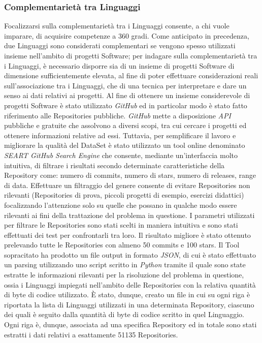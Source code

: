 \subsubsection{Complementarietà tra Linguaggi}
Focalizzarsi sulla complementarietà tra i Linguaggi consente, a chi vuole imparare, di acquisire competenze a 360 gradi.
 Come anticipato in precedenza, due Linguaggi sono considerati complementari se vengono spesso utilizzati insieme nell'ambito di progetti Software; per indagare sulla complementarietà tra i Linguaggi, è necessario disporre sia di un insieme di progetti Software di dimensione sufficientemente elevata, al fine di poter effettuare considerazioni reali sull'associazione tra i Linguaggi, che di una tecnica per interpretare e dare un senso ai dati relativi ai progetti. Al fine di ottenere un insieme considerevole di progetti Software è stato utilizzato \emph{GitHub} ed in particolar modo è stato fatto riferimento alle Repositories pubbliche.
\emph{GitHub} mette a disposizione \emph{API} pubbliche e gratuite che assolvono a diversi scopi, tra cui cercare i progetti ed ottenere informazioni relative ad essi. Tuttavia, per semplificare il lavoro e migliorare la qualità del DataSet è stato utilizzato un tool online denominato \emph{SEART GitHub Search Engine} \cite{Dabic:msr2021data} che consente, mediante un'interfaccia molto intuitiva, di filtrare i risultati secondo determinate caratteristiche della Repository come: numero di commits, numero di stars, numero di releases, range di data. 
Effettuare un filtraggio del genere consente di evitare Repositories non rilevanti (Repositories di prova, piccoli progetti di esempio, esercizi didattici) focalizzando l'attenzione solo su quelle che possano in qualche modo essere rilevanti ai fini della trattazione del problema in questione. 
I parametri utilizzati per filtrare le Repositories sono stati scelti in maniera intuitiva e sono stati effettuati dei test per confrontarli tra loro. Il risultato migliore è stato ottenuto prelevando tutte le Repositories con almeno 50 commits e 100 stars. Il Tool sopracitato ha prodotto un file output in formato \emph{JSON}, di cui è stato effettuato un parsing utilizzando uno script scritto in \emph{Python} tramite il quale sono state estratte le informazioni rilevanti per la risoluzione del problema in questione, ossia i Linguaggi impiegati nell'ambito delle Repositories con la relativa quantità di byte di codice utilizzato. È stato, dunque, creato un file in cui su ogni riga è riportata la lista di Linguaggi utilizzati in una determinata Repository, ciascuno dei quali è seguito dalla quantità di byte di codice scritto in quel Linguaggio. Ogni riga è, dunque, associata ad una specifica Repository ed in totale sono stati estratti i dati relativi a esattamente 51135 Repositories. 
